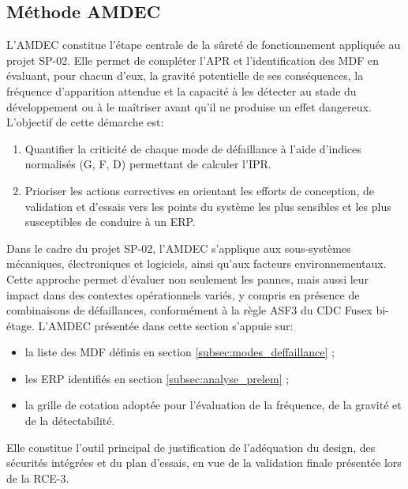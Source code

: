 \subsection{Méthode \acrshort{AMDEC}}
\label{subsec:amdec}

L’\acrfull{AMDEC} constitue l’étape centrale de la sûreté de fonctionnement appliquée au projet SP-02. Elle permet de compléter
l’\acrlong{APR} et l’identification des \acrlong{MDF} en évaluant, pour chacun d’eux, la gravité potentielle de ses
conséquences, la fréquence d’apparition attendue et la capacité à les détecter au stade du développement ou à le maîtriser
avant qu’il ne produise un effet dangereux. L’objectif de cette démarche est:
\begin{enumerate}
    \item Quantifier la criticité de chaque mode de défaillance à l’aide d’indices normalisés (G, F, D) permettant de calculer
    l’\acrfull{IPR}.
    \item Prioriser les actions correctives en orientant les efforts de conception, de validation et d’essais vers les points du
    système les plus sensibles et les plus susceptibles de conduire à un \acrlong{ERP}.\\
\end{enumerate}

Dans le cadre du projet SP-02, l’\acrshort{AMDEC} s’applique aux sous-systèmes mécaniques, électroniques et logiciels, ainsi qu’aux
facteurs environnementaux. Cette approche permet d’évaluer non seulement les pannes, mais aussi leur impact dans des contextes
opérationnels variés, y compris en présence de combinaisons de défaillances, conformément à la règle ASF3 du \acrshort{CDC}
\gls{Fusex} bi-étage. L’\acrshort{AMDEC} présentée dans cette section s’appuie sur:
\begin{itemize}
    \item la liste des \acrfull{MDF} définis en section \ref{subsec:modes_deffaillance} ;
    \item les \acrfull{ERP} identifiés en section \ref{subsec:analyse_prelem} ;
    \item la grille de cotation adoptée pour l’évaluation de la fréquence, de la gravité et de la détectabilité.\\
\end{itemize}

Elle constitue l’outil principal de justification de l’adéquation du design, des sécurités intégrées et du plan d’essais, en vue de
la validation finale présentée lors de la \acrshort{RCE}-3.\\

